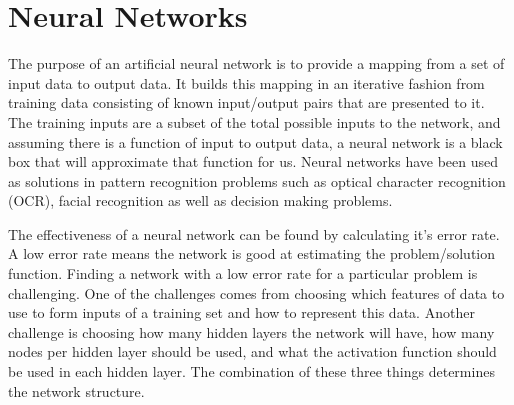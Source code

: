 \chapter[Neural Networks]{Neural Networks}
The purpose of an artificial neural network is to provide a mapping from a set of input data to output data. It builds this mapping in an iterative fashion from training data consisting of known input/output pairs that are presented to it. The training inputs are a subset of the total possible inputs to the network, and assuming there is a function of input to output data, a neural network is a black box that will approximate that function for us. Neural networks have been used as solutions in pattern recognition problems such as optical character recognition (OCR)\cite{ocr1}\cite{ocr2}, facial recognition\cite{face} as well as decision making problems\cite{decisionMaking1}\cite{decisionMaking2}.

The effectiveness of a neural network can be found by calculating it's error rate. A low error rate means the network is good at estimating the problem/solution function. Finding a network with a low error rate for a particular problem is challenging. One of the challenges comes from choosing which features of data to use to form inputs of a training set and how to represent this data. Another challenge is choosing how many hidden layers the network will have, how many nodes per hidden layer should be used, and what the activation function should be used in each hidden layer. The combination of these three things determines the network structure. 